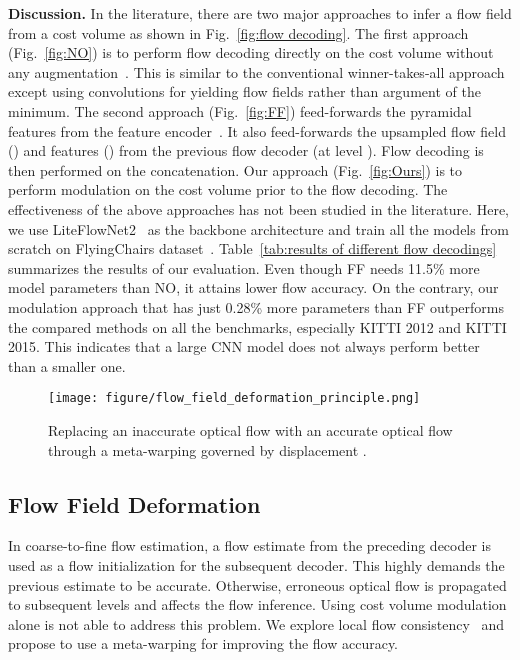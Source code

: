 \documentclass[runningheads]{llncs}
\begin{document}
\vspace{0.1cm} \noindent \textbf{Discussion.} In the literature, there are two major approaches to infer a flow field from a cost volume as shown in Fig.~\ref{fig:flow decoding}.
The first approach (Fig.~\ref{fig:NO}) is to perform flow decoding directly on the cost volume without any augmentation~\cite{Hui18,Hui20}. This is similar to the conventional winner-takes-all approach~\cite{Kang01} except using convolutions for yielding flow fields rather than argument of the minimum.
The second approach (Fig.~\ref{fig:FF}) feed-forwards the pyramidal features  from the feature encoder~\cite{Sun18,Sun19}. It also feed-forwards the upsampled flow field () and features () from the previous flow decoder (at level ). Flow decoding is then performed on the concatenation. 
Our approach (Fig.~\ref{fig:Ours}) is to perform modulation on the cost volume prior to the flow decoding.
The effectiveness of the above approaches has not been studied in the literature. Here, we use LiteFlowNet2~\cite{Hui20} as the backbone architecture and train all the models from scratch on FlyingChairs dataset~\cite{Dosovitskiy15}. Table~\ref{tab:results of different flow decodings} summarizes the results of our evaluation. Even though FF needs 11.5\% more model parameters than NO, it attains lower flow accuracy. On the contrary, our modulation approach that has just 0.28\% more parameters than FF outperforms the compared methods on all the benchmarks, especially KITTI 2012 and KITTI 2015. This indicates that a large CNN model does not always perform better than a smaller one.

\begin{figure}[t]
\centering
   \texttt{[image: figure/flow\_field\_deformation\_principle.png]}
\caption{Replacing an inaccurate optical flow  with an accurate optical flow  through a meta-warping governed by displacement .}
\label{fig:flow field deformation principle}
\end{figure}

\subsection{Flow Field Deformation}
\label{sec:flow field deformation}
In coarse-to-fine flow estimation, a flow estimate from the preceding decoder is used as a flow initialization for the subsequent decoder. This highly demands the previous estimate to be accurate. Otherwise, erroneous optical flow is propagated to subsequent levels and affects the flow inference. 
Using cost volume modulation alone is not able to address this problem. We explore local flow consistency~\cite{Werlberger09,Zimmer11} and propose to use a meta-warping for improving the flow accuracy. 
\end{document}
